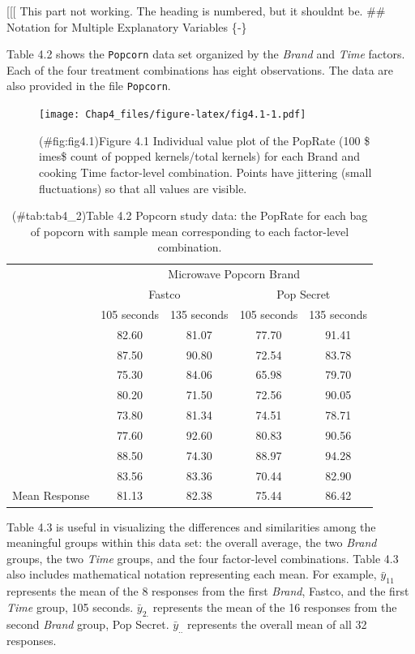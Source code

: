 \documentclass[
]{report}
\begin{document}
{[}{[}{[} This part not working. The heading is numbered, but it shouldnt be.
\#\# Notation for Multiple Explanatory Variables \{‑\}

Table 4.2 shows the \texttt{Popcorn} data set organized by the \emph{Brand} and \emph{Time} factors. Each of the four treatment combinations has eight observations. The data are also provided in the file \texttt{Popcorn}.

\begin{figure}
\centering
\texttt{[image: Chap4\_files/figure-latex/fig4.1-1.pdf]}
\caption{(\#fig:fig4.1)Figure 4.1 Individual value plot of the PopRate (100 \$ imes\$ count of popped kernels/total kernels) for each Brand and cooking Time factor-level combination. Points have jittering (small fluctuations) so that all values are visible.}
\end{figure}

\begin{table}[!h]
\centering
\caption{(\#tab:tab4_2)Table 4.2 Popcorn study data: the PopRate for each bag of popcorn with sample mean corresponding to each factor-level combination.}
\centering
\begin{tabular}[t]{lcccc}
\toprule
\multicolumn{1}{c}{ } & \multicolumn{4}{c}{Microwave Popcorn Brand} \\
\cmidrule(l{3pt}r{3pt}){2-5}
\multicolumn{1}{c}{ } & \multicolumn{2}{c}{Fastco} & \multicolumn{2}{c}{Pop Secret} \\
\cmidrule(l{3pt}r{3pt}){2-3} \cmidrule(l{3pt}r{3pt}){4-5}
 & 105 seconds & 135 seconds & 105 seconds & 135 seconds\\
\midrule
 & 82.60 & 81.07 & 77.70 & 91.41\\
 & 87.50 & 90.80 & 72.54 & 83.78\\
 & 75.30 & 84.06 & 65.98 & 79.70\\
 & 80.20 & 71.50 & 72.56 & 90.05\\
 & 73.80 & 81.34 & 74.51 & 78.71\\
\addlinespace
 & 77.60 & 92.60 & 80.83 & 90.56\\
 & 88.50 & 74.30 & 88.97 & 94.28\\
 & 83.56 & 83.36 & 70.44 & 82.90\\
Mean Response & 81.13 & 82.38 & 75.44 & 86.42\\
\bottomrule
\end{tabular}
\end{table}

Table 4.3 is useful in visualizing the differences and similarities among the meaningful groups within this data set: the overall average, the two \emph{Brand} groups, the two \emph{Time} groups, and the four factor-level combinations. Table 4.3 also includes mathematical notation representing each mean. For example, \(\bar{y}_{11}\) represents the mean of the 8 responses from the first \emph{Brand}, Fastco, and the first \emph{Time} group, 105 seconds. \(\bar{y}_{2.}\) represents the mean of the 16 responses from the second \emph{Brand} group, Pop Secret. \(\bar{y}_{..}\) represents the overall mean of all 32 responses.
\end{document}
